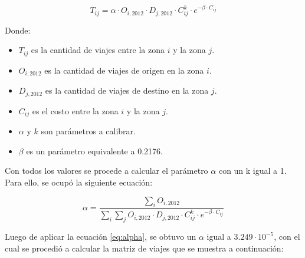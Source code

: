 \documentclass[letterpaper,12pt]{article}
\begin{document}
\begin{equation}
    T_{ij} = \alpha \cdot O_{i,2012} \cdot D_{j,2012} \cdot C_{ij}^k \cdot e^{-\beta \cdot C_{ij}}
    \label{eq}
\end{equation}

Donde:
\begin{itemize}
    \item $T_{ij}$ es la cantidad de viajes entre la zona $i$ y la zona $j$.
    \item $O_{i,2012}$ es la cantidad de viajes de origen en la zona $i$.
    \item $D_{j,2012}$ es la cantidad de viajes de destino en la zona $j$.
    \item $C_{ij}$ es el costo entre la zona $i$ y la zona $j$.
    \item $\alpha$ y $k$ son parámetros a calibrar.
    \item $\beta$ es un parámetro equivalente a 0.2176.
\end{itemize}



Con todos los valores se procede a calcular el parámetro $\alpha$ con un k igual a 1. Para ello, se ocupó la siguiente ecuación:

\begin{equation}
    \alpha = \frac{\sum_i O_{i,2012}}{\sum_i \sum_j O_{i,2012} \cdot D_{j,2012} \cdot C_{ij}^k \cdot e^{-\beta \cdot C_{ij}}}
    \label{eq:alpha}
\end{equation}

Luego de aplicar la ecuación \ref{eq:alpha}, se obtuvo un  $\alpha$ igual a $3.249 \cdot 10^{-5}$, con el cual se procedió a calcular la matriz de viajes que se muestra a continuación:
\end{document}
